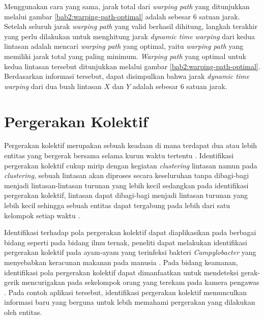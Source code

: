 Menggunakan cara yang sama, jarak total dari \textit{warping path} yang ditunjukkan melalui gambar \ref{bab2:warping-path-optimal} adalah sebesar $6$ satuan jarak. Setelah seluruh jarak \textit{warping path} yang valid berhasil dihitung, langkah terakhir yang perlu dilakukan untuk menghitung jarak \textit{dynamic time warping} dari kedua lintasan adalah mencari \textit{warping path} yang optimal, yaitu \textit{warping path} yang memiliki jarak total yang paling minimum. \textit{Warping path} yang optimal untuk kedua lintasan tersebut ditunjukkan melalui gambar \ref{bab2:warping-path-optimal}. Berdasarkan informasi tersebut, dapat disimpulkan bahwa jarak \textit{dynamic time warping} dari dua buah lintasan $X$ dan $Y$ adalah sebesar $6$ satuan jarak.

\iffalse 

\lionov{harus ditambah contoh perhitungan}

\fi

\section{Pergerakan Kolektif}
\label{sec:collective-movement}

Pergerakan kolektif merupakan sebuah keadaan di mana terdapat dua atau lebih entitas yang bergerak bersama selama kurun waktu tertentu \cite{wiratma:trajectory}. Identifikasi pergerakan kolektif cukup mirip dengan kegiatan \textit{clustering} lintasan namun pada \textit{clustering}, sebuah lintasan akan diproses secara keseluruhan tanpa dibagi-bagi menjadi lintasan-lintasan turunan yang lebih kecil sedangkan pada identifikasi pergerakan kolektif, lintasan dapat dibagi-bagi menjadi lintasan turunan yang lebih kecil sehingga sebuah entitas dapat tergabung pada lebih dari satu kelompok setiap waktu \cite{wiratma:trajectory}.

Identifikasi terhadap pola pergerakan kolektif dapat diaplikasikan pada berbagai bidang seperti pada bidang ilmu ternak, peneliti dapat melakukan identifikasi pergerakan kolektif pada ayam-ayam yang terinfeksi bakteri \textit{Campylobacter} yang menyebabkan keracunan makanan pada manusia \cite{colles:02:chicken}. Pada bidang keamanan, identifikasi pola pergerakan kolektif dapat dimanfaatkan untuk mendeteksi gerak-gerik mencurigakan pada sekelompok orang yang terekam pada kamera pengawas \cite{makris:01:security}. Pada contoh aplikasi tersebut, identifikasi pergerakan kolektif memunculkan informasi baru yang berguna untuk lebih memahami pergerakan yang dilakukan oleh entitas.


